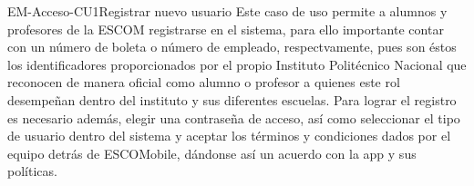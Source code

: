 


	\begin{UseCase}{EM-Acceso-CU1}{Registrar nuevo usuario}{
			\noindent
			Este caso de uso permite a alumnos y profesores de la ESCOM registrarse en el sistema, para ello importante contar con un número de boleta o número de empleado, respectvamente, pues son éstos los identificadores proporcionados por el propio Instituto Politécnico Nacional que reconocen de manera oficial como alumno o profesor a quienes este rol desempeñan dentro del instituto y sus diferentes escuelas. 
			\noindent
			Para lograr el registro es necesario además, elegir una contraseña de acceso, así como seleccionar el tipo de usuario dentro del sistema y aceptar los términos y condiciones dados por el equipo detrás de ESCOMobile, dándonse así un acuerdo con la app y sus políticas.
			\newline 
		}




\end{UseCase}
